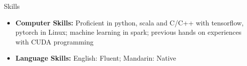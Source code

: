 \documentclass[a4paper,8pt,oneside]{scrartcl}
\newenvironment{ressection}[1]{
    \vspace{2pt}
    {\selectfont#1}
    \begin{itemize}
    \vspace{0pt}
}{
    \end{itemize}
}
\newcommand{\resitem}[1]{
    \vspace{-4pt}
    \item #1
}
\newcommand{\resitems}[1]{
    \vspace{-4pt}
    \item #1
}
\begin{document}

\begin{ressection}{Skills}
    \resitem{\textbf{Computer Skills:} Proficient in python, scala and C/C++ with tensorflow, pytorch in Linux; machine learning in spark; previous hands on experiences with CUDA programming}
    \resitem{\textbf{Language Skills:} English: Fluent; Mandarin: Native}
    
\end{ressection}

\vspace{2pt}

\end{document}

